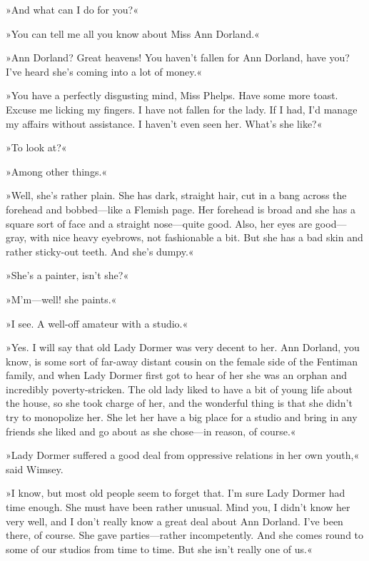 »And what can I do for you?«

»You can tell me all you know about Miss Ann Dorland.«

»Ann Dorland? Great heavens! You haven't fallen for Ann Dorland, have you? I've heard she's coming into a lot of money.«

»You have a perfectly disgusting mind, Miss Phelps. Have some more toast. Excuse me licking my fingers. I have not fallen for the lady. If I had, I'd manage my affairs without assistance. I haven't even seen her. What's she like?«

»To look at?«

»Among other things.«

»Well, she's rather plain. She has dark, straight hair, cut in a bang across the forehead and bobbed\allowbreak---\allowbreak like a Flemish page. Her forehead is broad and she has a square sort of face and a straight nose\allowbreak---\allowbreak quite good. Also, her eyes are good\allowbreak---\allowbreak gray, with nice heavy eyebrows, not fashionable a bit. But she has a bad skin and rather sticky-out teeth. And she's dumpy.«

»She's a painter, isn't she?«

»M'm\allowbreak---\allowbreak well! she paints.«

»I see. A well-off amateur with a studio.«

»Yes. I will say that old Lady Dormer was very decent to her. Ann Dorland, you know, is some sort of far-away distant cousin on the female side of the Fentiman family, and when Lady Dormer first got to hear of her she was an orphan and incredibly poverty-stricken. The old lady liked to have a bit of young life about the house, so she took charge of her, and the wonderful thing is that she didn't try to monopolize her. She let her have a big place for a studio and bring in any friends she liked and go about as she chose\allowbreak---\allowbreak in reason, of course.«

»Lady Dormer suffered a good deal from oppressive relations in her own youth,« said Wimsey.

»I know, but most old people seem to forget that. I'm sure Lady Dormer had time enough. She must have been rather unusual. Mind you, I didn't know her very well, and I don't really know a great deal about Ann Dorland. I've been there, of course. She gave parties\allowbreak---\allowbreak rather incompetently. And she comes round to some of our studios from time to time. But she isn't really one of us.«

